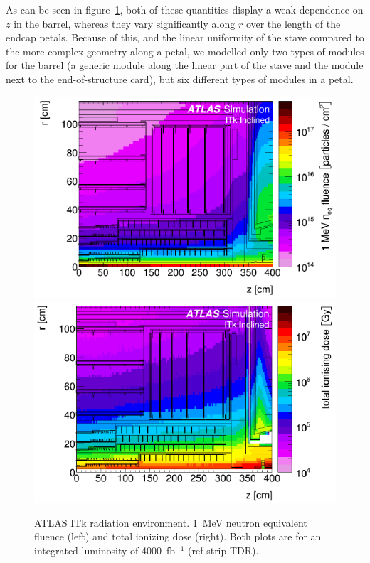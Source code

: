 As can be seen in figure~\ref{fig:radiation}, both of these quantities display a weak dependence on $z$ in the barrel, whereas they vary significantly along $r$ over the length of the endcap petals. Because of this, and the linear uniformity of the stave compared to the more complex geometry along a petal, we modelled only two types of modules for the barrel (a generic module along the linear part of the stave and the module next to the end-of-structure card), but six different types of modules in a petal.

\begin{figure}[ht]
\centering
\includegraphics[width=0.48\linewidth]{figures/fluence.pdf}\quad
\includegraphics[width=0.48\linewidth]{figures/TID.pdf}
\caption{ATLAS ITk radiation environment. 1~MeV neutron equivalent fluence (left) and total ionizing dose (right). Both plots are for an integrated luminosity of 4000~fb$^{-1}$ (ref strip TDR).}
\label{fig:radiation}
\end{figure}


